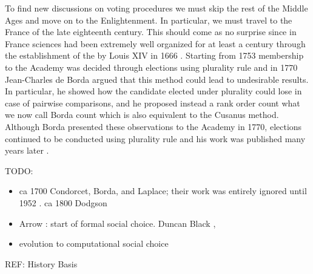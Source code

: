 To find new discussions on voting procedures we must skip the rest of the Middle Ages and move on to the Enlightenment. In particular, we must travel to the France of the late eighteenth century. This should come as no surprise since in France sciences had been extremely well organized for at least a century through the establishment of the  by Louis XIV in 1666 \citep{Demeulenaere1995}. Starting from 1753 membership to the Academy was decided through elections using plurality rule and in 1770 Jean-Charles de Borda argued that this method could lead to undesirable results. In particular, he showed how the candidate elected under plurality could lose in case of pairwise comparisons, and he proposed instead a rank order count \textemdash what we now call Borda count which is also equivalent to the Cusanus method. Although Borda presented these observations to the Academy in 1770, elections continued to be conducted using plurality rule and his work was published many years later \citep{Borda1781}.








TODO:
\begin{itemize}
	\item ca 1700 Condorcet, Borda, and Laplace; their work was entirely ignored until 1952 . ca 1800 Dodgson
	\item Arrow \cite{Arrow1951}: start of formal social choice. Duncan Black \cite{Black1958}, \citet{Arrow2002,Arrow2011}
	\item evolution to computational social choice \cite{Comsoc2016}
\end{itemize}

REF:
History \citet{McLeanUrken1995,McLean1990,Urken2004} 
Basis \citet{Gaertner2006, Taylor2005, Nitzan2009}





